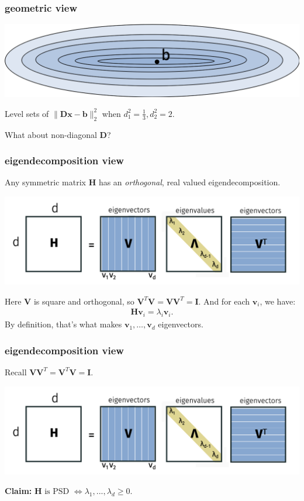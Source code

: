 \documentclass[compress]{beamer}
\newcommand{\bv}[1]{\mathbf{#1}}
\begin{document}
\begin{frame}[t]
	\frametitle{geometric view}
	\begin{center}
		\includegraphics[width=\textwidth]{poor_conditioning.png}
		
		Level sets of $\|\bv{D}\bv{x} - \bv{b}\|_2^2$ when $d_1^2 = \frac{1}{3}, d_2^2 = 2$. 
	\end{center}

\vspace{8em}
What about non-diagonal $\bv{D}$?
\end{frame}

\begin{frame}[t]
	\frametitle{eigendecomposition view}
	Any symmetric matrix $\bv{H}$ has an \emph{orthogonal}, real valued eigendecomposition. 
	\begin{center}
		\includegraphics[width=.9\textwidth]{eigendecomp.png}
	\end{center}
	Here $\bv{V}$ is square and orthogonal, so $\bv{V}^T\bv{V} = \bv{V}\bv{V}^T = \bv{I}$. And for each $\bv{v}_i$, we have:
	\begin{align*}
		\bv{H}\bv{v}_i = \lambda_i \bv{v}_i. 
	\end{align*}
	By definition, that's what makes $\bv{v}_1, \ldots, \bv{v}_d$ eigenvectors.	
\end{frame}

\begin{frame}[t]
	\frametitle{eigendecomposition view}
	Recall $\bv{V}\bv{V}^T = \bv{V}^T\bv{V} = \bv{I}$.
	\begin{center}
		\includegraphics[width=.9\textwidth]{eigendecomp.png}
	\end{center}
	\textbf{Claim:}	$\bv{H} \text{ is PSD } \Leftrightarrow \lambda_1, ..., \lambda_d \geq 0$. 
\end{frame}
\end{document}
